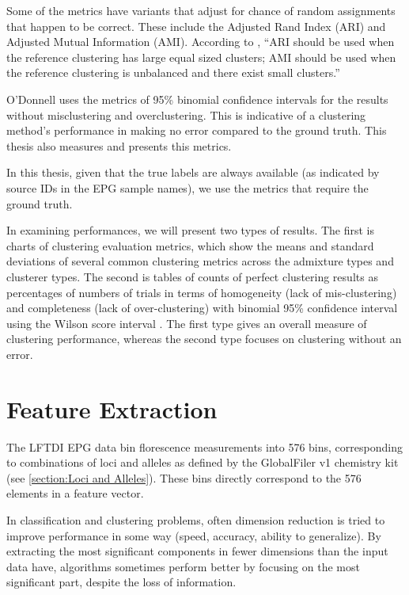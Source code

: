 Some of the metrics have variants that adjust for chance of random assignments that happen to be correct. These include the Adjusted Rand Index (ARI) and Adjusted Mutual Information (AMI). According to \cite{romano_adjusting_2015}, ``ARI should be used when the reference clustering has large equal sized clusters; AMI should be used when the reference clustering is unbalanced and there exist small clusters.''

O'Donnell \cite{odonnell_clustering_2021} uses the metrics of 95\% binomial confidence intervals for the results without misclustering and overclustering. This is indicative of a clustering method's performance in making no error compared to the ground truth. This thesis also measures and presents this metrics.

In this thesis, given that the true labels are always available (as indicated by source IDs in the EPG sample names), we use the metrics that require the ground truth.

In examining performances, we will present two types of results. The first is charts of clustering evaluation metrics, which show the means and standard deviations of several common clustering metrics across the admixture types and clusterer types. The second is tables of counts of perfect clustering results as percentages of numbers of trials in terms of homogeneity (lack of mis-clustering) and completeness (lack of over-clustering) with binomial 95\% confidence interval using the Wilson score interval \cite{wilson_probable_1927}. The first type gives an overall measure of clustering performance, whereas the second type focuses on clustering without an error.

\section{Feature Extraction}

The LFTDI EPG data bin florescence measurements into 576 bins, corresponding to combinations of loci and alleles as defined by the GlobalFiler v1 chemistry kit (see \ref{section:Loci and Alleles}). These bins directly correspond to the 576 elements in a feature vector.

In classification and clustering problems, often dimension reduction is tried to improve performance in some way (speed, accuracy, ability to generalize). By extracting the most significant components in fewer dimensions than the input data have, algorithms sometimes perform better by focusing on the most significant part, despite the loss of information.

